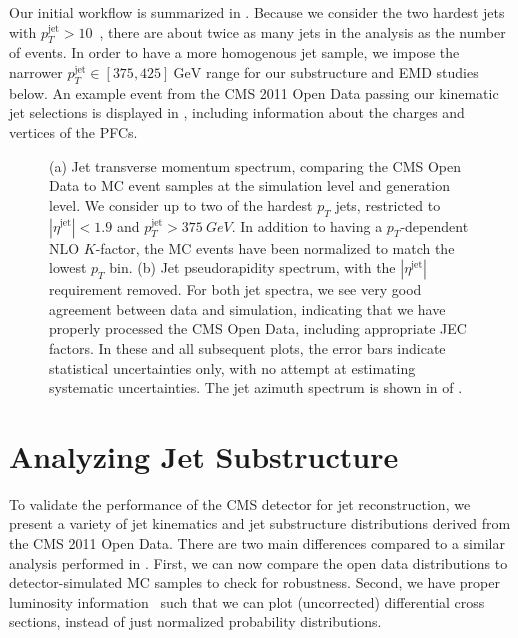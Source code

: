 \documentclass[aps,prd,twocolumn,preprintnumbers,nofootinbib,longbibliography,floatfix,superscriptaddress]{revtex4-1}
\begin{document}
Our initial workflow is summarized in .
%
Because we consider the two hardest jets with $p_T^\text{jet}>10$~, there are about twice as many jets in the analysis as the number of events.
%
In order to have a more homogenous jet sample, we impose the narrower $p_T^\text{jet} \in [375,425]~\text{GeV}$ range for our substructure and EMD studies below.
%
An example event from the CMS 2011 Open Data passing our kinematic jet selections is displayed in , including information about the charges and vertices of the PFCs.


\begin{figure*}[t]
  \caption{
  (a) Jet transverse momentum spectrum, comparing the CMS Open Data to MC event samples at the simulation level and generation level.
  We consider up to two of the hardest $p_T$ jets, restricted to $|\eta^\text{jet}| < 1.9$ and $p_T^\text{jet} > \SI{375}{GeV}$.
  In addition to having a $p_T$-dependent NLO $K$-factor, the MC events have been normalized to match the lowest $p_T$ bin.
  (b) Jet pseudorapidity spectrum, with the $|\eta^\text{jet}|$ requirement removed.
  For both jet spectra, we see very good agreement between data and simulation, indicating that we have properly processed the CMS Open Data, including appropriate JEC factors.
%
In these and all subsequent plots, the error bars indicate statistical uncertainties only, with no attempt at estimating systematic uncertainties.
%
The jet azimuth spectrum is shown in  of .
}
  \label{fig:overalljetkinematics}
\end{figure*}



\section{Analyzing Jet Substructure}
\label{sec:jetsubstructure}


To validate the performance of the CMS detector for jet reconstruction, we present a variety of jet kinematics and jet substructure distributions derived from the CMS 2011 Open Data.
%
There are two main differences compared to a similar analysis performed in .
%
First, we can now compare the open data distributions to detector-simulated MC samples to check for robustness.
%
Second, we have proper luminosity information~\cite{CMS:luminosity2011} such that we can plot (uncorrected) differential cross sections, instead of just normalized probability distributions.
\end{document}
